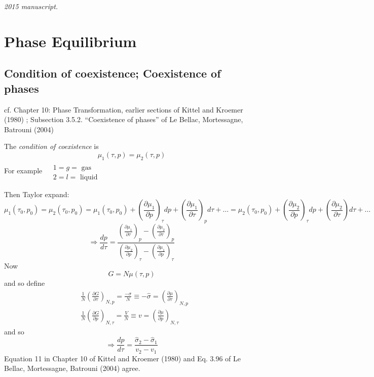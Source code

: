 \noindent\textit{2015 manuscript.}

\section{Phase Equilibrium}

\subsection{Condition of coexistence; Coexistence of phases}

cf. Chapter 10: Phase Transformation, earlier sections of Kittel and Kroemer (1980) \cite{CKittelHKroemer1980}; Subsection 3.5.2. ``Coexistence of phases'' of Le Bellac, Mortessagne, Batrouni (2004) \cite{MLeBellacFMortessagneGBatrouni2004}

The \emph{condition of coexistence} is 
\[
\mu_1(\tau,p) = \mu_2(\tau,p)
\]
For example $\begin{aligned} & \quad \\
  & 1 = g = \text{ gas } \\
  & 2 = l = \text{ liquid } \end{aligned}$

Then Taylor expand:
\[
\mu_1(\tau_0,p_0) = \mu_2(\tau_0,p_0) = \mu_1(\tau_0,p_0) + \left( \frac{ \partial \mu_1}{ \partial p} \right)_{\tau} dp + \left( \frac{ \partial \mu_1}{ \partial \tau } \right)_p d\tau + \dots = \mu_2(\tau_0,p_0) + \left( \frac{ \partial \mu_2}{ \partial p} \right)_{\tau} dp + \left( \frac{ \partial \mu_2}{ \partial \tau} \right) d\tau + \dots
\]
\[
\Longrightarrow \frac{dp}{d\tau} = \frac{ \left( \frac{ \partial \mu_1}{ \partial \tau} \right)_p - \left( \frac{ \partial \mu_2}{ \partial \tau} \right)_p }{ \left( \frac{ \partial \mu_2}{ \partial p} \right)_{\tau} - \left( \frac{ \partial \mu_1}{ \partial p }\right)_{\tau}  }
\]
Now
\[
G= N\mu(\tau,p)
\]
and so define
\[
\begin{aligned}
  & \frac{1}{N} \left( \frac{ \partial G}{ \partial \tau} \right)_{N,p} = \frac{-\sigma}{N} \equiv - \widehat{\sigma} =  \left( \frac{ \partial \mu }{ \partial \tau} \right)_{N,p} \\
  & \frac{1}{N} \left( \frac{ \partial G}{ \partial p} \right)_{N,\tau} = \frac{V}{N} \equiv v =  \left( \frac{ \partial \mu }{ \partial p} \right)_{N,\tau} 
\end{aligned}
\]
and so
\[
\Longrightarrow \frac{dp}{d\tau} = \frac{ \widehat{\sigma}_2 - \widehat{\sigma}_1}{ v_2 - v_1}
\]
Equation 11 in Chapter 10 of Kittel and Kroemer (1980) \cite{CKittelHKroemer1980} and Eq. 3.96 of Le Bellac, Mortessagne, Batrouni (2004) \cite{MLeBellacFMortessagneGBatrouni2004} agree. 

